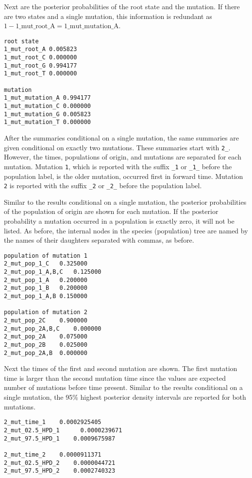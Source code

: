\documentclass[11pt]{article}
\begin{document}
Next are the posterior probabilities of the root state and the mutation. 
If there are two states and a single mutation, this information is redundant as $1 - \text{1\_mut\_root\_A} = \text{1\_mut\_mutation\_A}$.
\begin{Verbatim}[frame=single, fontsize=\small]
root state
1_mut_root_A 0.005823	
1_mut_root_C 0.000000	
1_mut_root_G 0.994177	
1_mut_root_T 0.000000	

mutation
1_mut_mutation_A 0.994177	
1_mut_mutation_C 0.000000	
1_mut_mutation_G 0.005823	
1_mut_mutation_T 0.000000
\end{Verbatim}

After the summaries conditional on a single mutation, the same summaries are given conditional on exactly two mutations. 
These summaries start with \texttt{2\_}. 
However, the times, populations of origin, and mutations are separated for each mutation. 
Mutation \texttt{1}, which is reported with the suffix \texttt{\_1} or \texttt{\_1\_} before the population label, is the older mutation, occurred first in forward time.
Mutation \texttt{2} is reported with the suffix \texttt{\_2} or \texttt{\_2\_} before the population label.

Similar to the results conditional on a single mutation, the posterior probabilities of the population of origin are shown for each mutation. 
If the posterior probability a mutation occurred in a population is exactly zero, it will not be listed. 
As before, the internal nodes in the species (population) tree are named by the names of their daughters separated with commas, as before.
\begin{Verbatim}[frame=single, fontsize=\small]
population of mutation 1
2_mut_pop_1_C	0.325000	
2_mut_pop_1_A,B,C	0.125000	
2_mut_pop_1_A	0.200000	
2_mut_pop_1_B	0.200000	
2_mut_pop_1_A,B	0.150000	

population of mutation 2
2_mut_pop_2C	0.900000	
2_mut_pop_2A,B,C	0.000000	
2_mut_pop_2A	0.075000	
2_mut_pop_2B	0.025000	
2_mut_pop_2A,B	0.000000	
\end{Verbatim}

Next the times of the first and second mutation are shown.
The first mutation time is larger than the second mutation time since the values are expected number of mutations before time present.
Similar to the results conditional on a single mutation, the 95\% highest posterior density intervals are reported for both mutations.
\begin{Verbatim}[frame=single, fontsize=\small]
2_mut_time_1	0.0002925405	
2_mut_02.5_HPD_1	  0.0000239671
2_mut_97.5_HPD_1	0.0009675987	

2_mut_time_2	0.0000911371	
2_mut_02.5_HPD_2	0.0000044721	
2_mut_97.5_HPD_2	0.0002740323	
	
\end{Verbatim}
\end{document}
